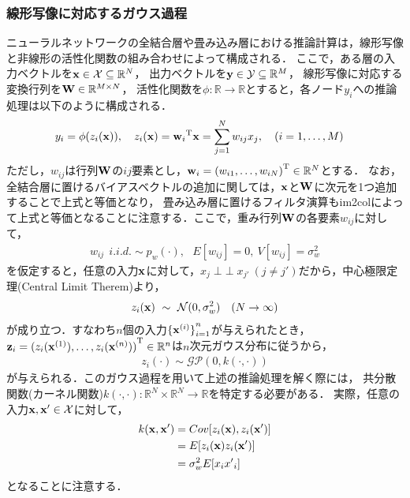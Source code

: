 \documentclass[11pt,a4j]{article}
\newcommand{\indep}{\mathop{\perp\!\!\!\perp}}
\begin{document}
      \subsubsection{線形写像に対応するガウス過程}
        ニューラルネットワークの全結合層や畳み込み層における推論計算は，線形写像と非線形の活性化関数の組み合わせによって構成される．
        ここで，ある層の入力ベクトルを${\bf x} \in \mathcal{X} \subseteq \mathbb{R}^{N}$，
        出力ベクトルを${\bf y} \in \mathcal{Y} \subseteq \mathbb{R}^{M}$，
        線形写像に対応する変換行列を${\bf W} \in \mathbb{R}^{M \times N}$，
        活性化関数を$\phi: \mathbb{R} \to \mathbb{R}$とすると，各ノード${y}_i$への推論処理は以下のように構成される．
        \begin{align}
          y_i &= \phi(z_i({\bf x})), ~~~ z_i({\bf x}) = {{\bf w}_i}^{\mathrm{T}} {\bf x} = \sum_{j=1}^{N} {w}_{ij} {x}_j, ~~~ (i=1,\dots,M) \label{form:nn_inference}
        \end{align}
        ただし，$w_{ij}$は行列$\bf W$の$ij$要素とし，${\bf w}_i = {( w_{i1}, \dots, w_{iN} )}^{\mathrm{T}} \in \mathbb{R}^{N}$とする．
        なお，全結合層に置けるバイアスベクトルの追加に関しては，$\bf x$と$\bf W$に次元を1つ追加することで上式と等価となり，
        畳み込み層に置けるフィルタ演算もim2colによって上式と等価となることに注意する．ここで，重み行列$\bf W$の各要素$w_{ij}$に対して，
        \begin{align}
          w_{ij} ~~ i.i.d. \sim p_w(\cdot), ~~~
          E[w_{ij}] = 0, ~ V[w_{ij}] = \sigma_w^2
        \end{align}
        を仮定すると，任意の入力${\bf x}$に対して，$x_j \indep x_{j'} ~ (j \neq j' )$だから，中心極限定理(Central Limit Therem)より，
        \begin{align}
          z_i({\bf x}) ~ \sim ~ \mathcal{N}(0, \sigma_w^2) ~~~ (N \to \infty)
        \end{align}
        が成り立つ．すなわち$n$個の入力${\{ {\bf x}^{(i)} \}}_{i=1}^{n}$が与えられたとき，
        ${\bf z}_i = { ( z_i({\bf x}^{(1)}),\dots,z_i({\bf x}^{(n)}) ) }^{\mathrm{T}} \in \mathbb{R}^{n}$は$n$次元ガウス分布に従うから，
        \begin{align}
          z_i(\cdot) \sim \mathcal{GP}(0, k(\cdot,\cdot))
        \end{align}
        が与えられる．このガウス過程を用いて上述の推論処理を解く際には，
        共分散関数(カーネル関数)$k(\cdot,\cdot): \mathbb{R}^{N} \times \mathbb{R}^{N} \to \mathbb{R}$を特定する必要がある．
        実際，任意の入力${\bf x}, {\bf x}' \in \mathcal{X}$に対して，
        \begin{align}
          k( {\bf x}, {\bf x}' ) 
          &= Cov[z_i({\bf x}), z_i({\bf x}')] \\ 
          &= E[z_i({\bf x}) z_i({\bf x}')] \\
          &= \sigma_w^2 E[ x_i {x'}_i ] 
        \end{align}
        となることに注意する．
\end{document}

